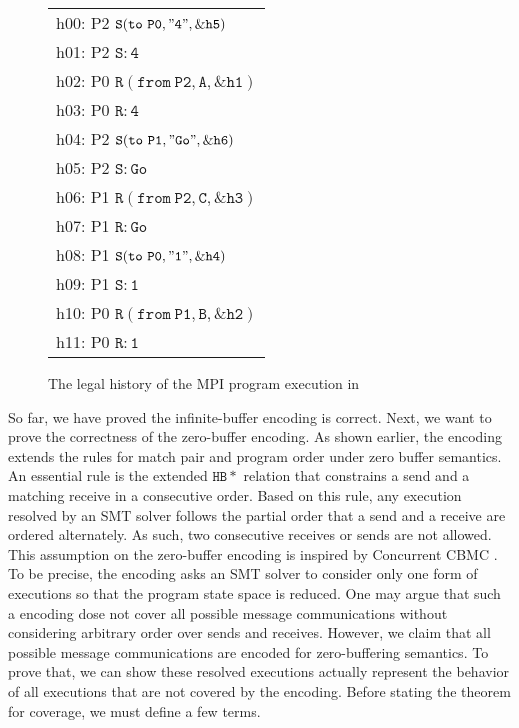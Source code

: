 \begin{figure}[history]
\begin{center}
\setlength{\tabcolsep}{2pt}
\small \begin{tabular}[t]{l}
h00: P2 $\mathtt{S(to\ P0, "4", \&h5)}$ \\
h01: P2 $\mathtt{S: 4}$\\
h02: P0 $\mathtt{R(from\ P2, A, \&h1)}$ \\
h03: P0 $\mathtt{R: 4}$ \\
h04: P2 $\mathtt{S(to\ P1, "Go", \&h6)}$ \\
h05: P2 $\mathtt{S: Go}$ \\
h06: P1 $\mathtt{R(from\ P2, C, \&h3)}$ \\
h07: P1 $\mathtt{R: Go}$ \\
h08: P1 $\mathtt{S(to\ P0, "1", \&h4)}$ \\
h09: P1 $\mathtt{S: 1}$ \\
h10: P0 $\mathtt{R(from\ P1, B, \&h2)}$ \\
h11: P0 $\mathtt{R: 1}$ \\
\end{tabular}
\end{center}
\caption{The legal history of the MPI program execution in }
\label{fig:history}
\end{figure}

So far, we have proved the infinite-buffer encoding is correct. Next, we want to prove the correctness of the zero-buffer encoding. As shown earlier, the encoding extends the rules for match pair and program order under zero buffer semantics. An essential rule is the extended $\mathtt{HB*}$ relation that constrains a send and a matching receive in a consecutive order. Based on this rule, any execution resolved by an SMT solver follows the partial order that a send and a receive are ordered alternately. As such, two consecutive receives or sends are not allowed. This assumption on the zero-buffer encoding is inspired by Concurrent CBMC \cite{}. To be precise, the encoding asks an SMT solver to consider only one form of executions so that the program state space is reduced. One may argue that such a encoding dose not cover all possible message communications without considering arbitrary order over sends and receives. However, we claim that all possible message communications are encoded for zero-buffering semantics. To prove that, we can show these resolved executions actually represent the behavior of all executions that are not covered by the encoding. Before stating the theorem for coverage, we must define a few terms.


